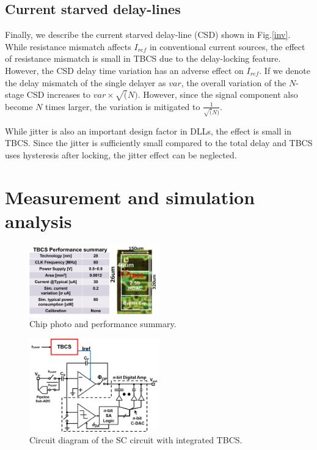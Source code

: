 \documentclass[letterpaper, 10 pt, conference]{ieeeconf}  %
\begin{document}
\subsection{Current starved delay-lines}

Finally, we describe the current starved delay-line (CSD) shown in Fig.\ref{inv}. While resistance mismatch affects $I_{ref}$ in conventional current sources, the effect of resistance mismatch is small in TBCS due to the delay-locking feature. However, the CSD delay time variation has an adverse effect on $I_{ref}$.
If we denote the delay mismatch of the single delayer as $var$, the overall variation of the $N$-stage CSD increases to $var \times \sqrt(N)$. However, since the signal component also become  $N$ times larger, the variation is mitigated to $\frac{1}{\sqrt(N)}$.

While jitter is also an important design factor in DLLs, the effect is small in TBCS. Since the jitter is sufficiently small compared to the total delay and TBCS uses hysteresis after locking, the jitter effect can be neglected.

\section{Measurement and simulation analysis}
\begin{figure}[!]
\centering
 \includegraphics[width=0.5\textwidth]{figs/chip.png}
  \caption{Chip photo and performance summary.}
\label{chip}
\end{figure}

\begin{figure}[!]
\centering
 \includegraphics[width=0.5\textwidth]{figs/switchcap.png}
  \caption{Circuit diagram of the SC circuit with integrated TBCS.}
\label{scap}
\end{figure}
\end{document}
